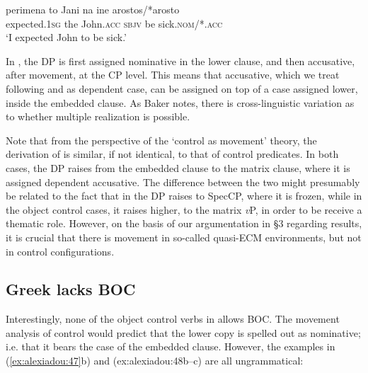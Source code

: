 \documentclass[output=paper]{langsci/langscibook}
\begin{document}
\ea%
    \label{ex:alexiadou:46}
    \gll perimena        to Jani           na    ine arostos/*arosto \\
         expected{}.\textsc{1sg} the John\textsc{{}.acc} \textsc{sbjv} be sick\textsc{{}.nom}/*\textsc{{}.acc} \\
    \glt ‘I expected John to be sick.’ 
    \z


In , the DP is first assigned nominative in the lower clause, and then accusative, after movement, at the CP level. This means that accusative, which we treat following \citet{Marantz1991} and \citet{Baker2015} as dependent case, can be assigned on top of a case assigned lower, inside the embedded clause. As Baker notes, there is cross-linguistic variation as to whether multiple realization is possible. 

Note that from the perspective of the ‘control as movement’ theory, the derivation of  is similar, if not identical, to that of control predicates. In both cases, the DP raises from the embedded clause to the matrix clause, where it is assigned dependent accusative. The difference between the two might presumably be related to the fact that in  the DP raises to SpecCP, where it is frozen, while in the object control cases, it raises higher, to the matrix \textit{v}P, in order to be receive a thematic role. However, on the basis of our argumentation in §3 regarding  results, it is crucial that there is movement in so-called quasi-ECM environments, but not in control configurations. 

\subsection{Greek lacks BOC}%

Interestingly, none of the object control verbs in  allows BOC. The movement analysis of control would predict that the lower copy is spelled out as nominative; i.e. that it bears the case of the embedded clause. However, the examples in (\ref{ex:alexiadou:47}b) and ({ex:alexiadou:48}b--c) are all ungrammatical:



\ea%
    \label{ex:alexiadou:47}
    \z
\z    
\end{document}
